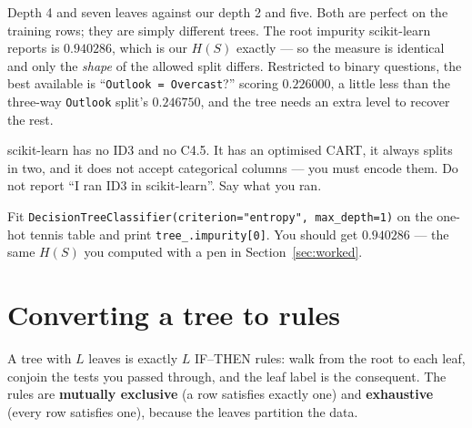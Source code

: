 \documentclass[11pt]{article}
\begin{document}
Depth 4 and seven leaves against our depth 2 and five. Both are perfect on the
training rows; they are simply different trees. The root impurity scikit-learn
reports is $0.940286$, which is our $H(S)$ exactly --- so the measure is
identical and only the \emph{shape} of the allowed split differs. Restricted
to binary questions, the best available is ``\texttt{Outlook = Overcast}?''
scoring $0.226000$, a little less than the three-way \texttt{Outlook} split's
$0.246750$, and the tree needs an extra level to recover the rest.

\begin{caution}
scikit-learn has no ID3 and no C4.5. It has an optimised CART, it always
splits in two, and it does not accept categorical columns --- you must encode
them. Do not report ``I ran ID3 in scikit-learn''. Say what you ran.
\end{caution}

\begin{tryit}
Fit \texttt{DecisionTreeClassifier(criterion="entropy", max\_depth=1)} on the
one-hot tennis table and print \texttt{tree\_.impurity[0]}. You should get
$0.940286$ --- the same $H(S)$ you computed with a pen in
Section~\ref{sec:worked}.
\end{tryit}

\notesources{\AMLUnitVISources}

\section{Converting a tree to rules}
\label{sec:rules}

A tree with $L$ leaves is exactly $L$ IF--THEN rules: walk from the root to
each leaf, conjoin the tests you passed through, and the leaf label is the
consequent. The rules are \textbf{mutually exclusive} (a row satisfies exactly
one) and \textbf{exhaustive} (every row satisfies one), because the leaves
partition the data.
\end{document}
